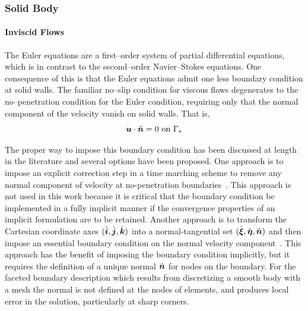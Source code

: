 \subsubsection{Solid Body\label{sect:comp_ns_bcs_solid}}
\paragraph{Inviscid Flows}
The Euler equations are a first--order system of partial differential equations, which is in contrast to the second--order Navier--Stokes equations.  One consequence of this is that the Euler equations admit one less boundary condition at solid walls.  The familiar no--slip condition for viscous flows degenerates to the no--penetration condition for the Euler condition, requiring only that the normal component of the velocity vanish on solid walls. That is,
\begin{equation}
  \label{eq:no_penetration}
  {\boldsymbol{u}}\cdot\hat{{\boldsymbol{n}}} = 0\mbox{ on } \Gamma_s
\end{equation}

The proper way to impose this boundary condition has been discussed at length in the literature and several options have been proposed.  One approach is to impose an explicit correction step in a time marching  scheme to remove any normal component of velocity at no-penetration boundaries~\cite{cfmht}.  This approach is not used in this work because it is critical that the boundary condition be implemented in a fully implicit manner if the convergence properties of an implicit formulation are to be retained.    Another approach is to transform the Cartesian coordinate axes $(\hat{{\boldsymbol{i}}},\hat{{\boldsymbol{j}}},\hat{{\boldsymbol{k}}})$ into a normal-tangential set $(\hat{{\boldsymbol{\xi}}},\hat{{\boldsymbol{\eta}}},\hat{{\boldsymbol{n}}})$ and then impose an essential boundary condition on the normal velocity component~\cite{skaliabadi_dissertation,gjlebeau_thesis}.  This approach has the benefit of imposing the boundary condition implicitly, but it requires the definition of a unique normal $\hat{{\boldsymbol{n}}}$ for nodes on the boundary.  For the faceted boundary description which results from discretizing a smooth body with a mesh the normal is not defined at the nodes of elements, and produces local error in the solution, particularly at sharp corners.  

